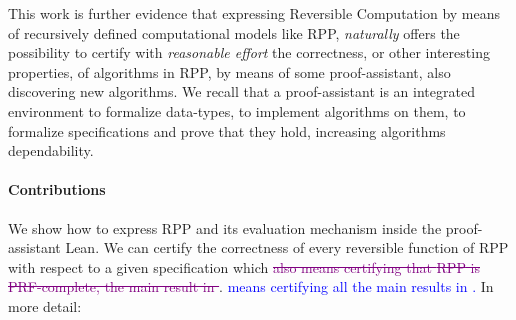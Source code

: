 \documentclass[preprint]{elsarticle}
\theoremstyle{remark}
\newcommand{\RPP}{\textsf{RPP}\xspace}
\newcommand{\PRF}{\textsf{PRF}\xspace}
\newcommand{\LEAN}{\textsf{Lean}\xspace}
\begin{document}
This work is further evidence that expressing Reversible Computation by means of recursively defined computational models like \RPP, \emph{naturally} offers the possibility to certify with \emph{reasonable effort} the correctness, or other interesting properties, of algorithms in \RPP, by means of some proof-assistant, also discovering new algorithms.
We recall that a proof-assistant is an integrated environment to formalize data-types, to implement algorithms on them, to formalize specifications and prove that they hold, increasing algorithms dependability.

\paragraph{Contributions}
We show how to express \RPP and its evaluation mechanism inside the proof-assistant \LEAN \cite{Lean3}. We can certify the correctness of every reversible function of \RPP with respect to a given specification which \textcolor{purple}{\sout{also means certifying that \RPP is \PRF-complete, the main result in \cite{DBLP:journals/tcs/PaoliniPR20}}}. \textcolor{blue}{means certifying all the main results in \cite{DBLP:journals/tcs/PaoliniPR20}. } In more detail:
\end{document}
